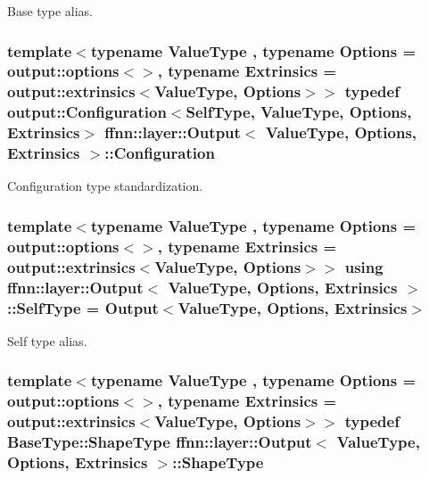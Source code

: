 Base type alias. 

\hypertarget{classffnn_1_1layer_1_1_output_a9e57e6ca1764925cea614e32886a1568}{
\subsubsection[{Configuration}]{\setlength{\rightskip}{0pt plus 5cm}template$<$typename Value\-Type , typename Options  = output\-::options$<$$>$, typename Extrinsics  = output\-::extrinsics$<$\-Value\-Type, Options$>$$>$ typedef {\bf output\-::\-Configuration}$<${\bf Self\-Type}, Value\-Type, Options, Extrinsics$>$ {\bf ffnn\-::layer\-::\-Output}$<$ Value\-Type, Options, Extrinsics $>$\-::{\bf Configuration}}}\label{classffnn_1_1layer_1_1_output_a9e57e6ca1764925cea614e32886a1568}


Configuration type standardization. 

\hypertarget{classffnn_1_1layer_1_1_output_a372fcfc142bc62cb466ad6b5a4feeaa2}{
\subsubsection[{Self\-Type}]{\setlength{\rightskip}{0pt plus 5cm}template$<$typename Value\-Type , typename Options  = output\-::options$<$$>$, typename Extrinsics  = output\-::extrinsics$<$\-Value\-Type, Options$>$$>$ using {\bf ffnn\-::layer\-::\-Output}$<$ Value\-Type, Options, Extrinsics $>$\-::{\bf Self\-Type} =  {\bf Output}$<$Value\-Type, Options, Extrinsics$>$}}\label{classffnn_1_1layer_1_1_output_a372fcfc142bc62cb466ad6b5a4feeaa2}


Self type alias. 

\hypertarget{classffnn_1_1layer_1_1_output_a8755e7ce13c1b45243a679a5a5376ee4}{
\subsubsection[{Shape\-Type}]{\setlength{\rightskip}{0pt plus 5cm}template$<$typename Value\-Type , typename Options  = output\-::options$<$$>$, typename Extrinsics  = output\-::extrinsics$<$\-Value\-Type, Options$>$$>$ typedef Base\-Type\-::\-Shape\-Type {\bf ffnn\-::layer\-::\-Output}$<$ Value\-Type, Options, Extrinsics $>$\-::{\bf Shape\-Type}}}\label{classffnn_1_1layer_1_1_output_a8755e7ce13c1b45243a679a5a5376ee4}


